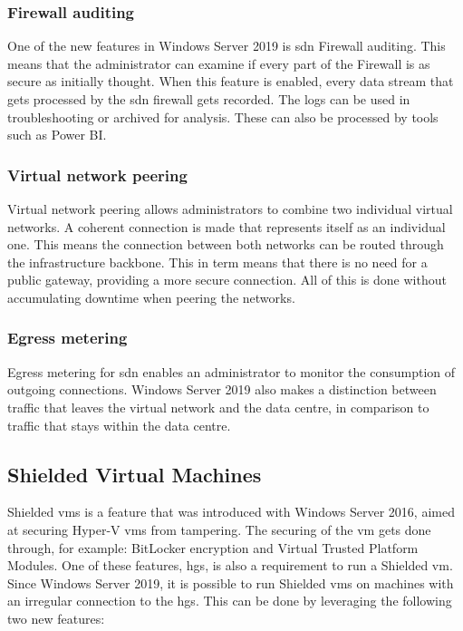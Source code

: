 \subsubsection{Firewall auditing}
One of the new features in Windows Server 2019 is \acrshort{sdn} Firewall auditing. 
This means that the administrator can examine if every part of the Firewall is as secure as initially thought. 
When this feature is enabled, every data stream that gets processed by the \acrshort{sdn} firewall gets recorded. 
The logs can be used in troubleshooting or archived for analysis. 
These can also be processed by tools such as Power BI.

\subsubsection{Virtual network peering}
Virtual network peering allows administrators to combine two individual virtual networks. 
A coherent connection is made that represents itself as an individual one. 
This means the connection between both networks can be routed through the infrastructure backbone. 
This in term means that there is no need for a public gateway, providing a more secure connection.
All of this is done without accumulating downtime when peering the networks.

\subsubsection{Egress metering}
Egress metering for \acrshort{sdn} enables an administrator to monitor the consumption of outgoing connections.
Windows Server 2019 also makes a distinction between traffic that leaves the virtual network and the data centre, in comparison to traffic that stays within the data centre. 

\subsection{Shielded Virtual Machines}
Shielded \acrshort{vm}s is a feature that was introduced with Windows Server 2016, aimed at securing Hyper-V \acrshort{vm}s from tampering. 
The securing of the \acrshort{vm} gets done through, for example: BitLocker encryption and Virtual Trusted Platform Modules. 
One of these features, \acrfull{hgs}, is also a requirement to run a Shielded \acrshort{vm}. 
Since Windows Server 2019, it is possible to run Shielded \acrshort{vm}s on machines with an irregular connection to the \acrshort{hgs}. 
This can be done by leveraging the following two new features:

